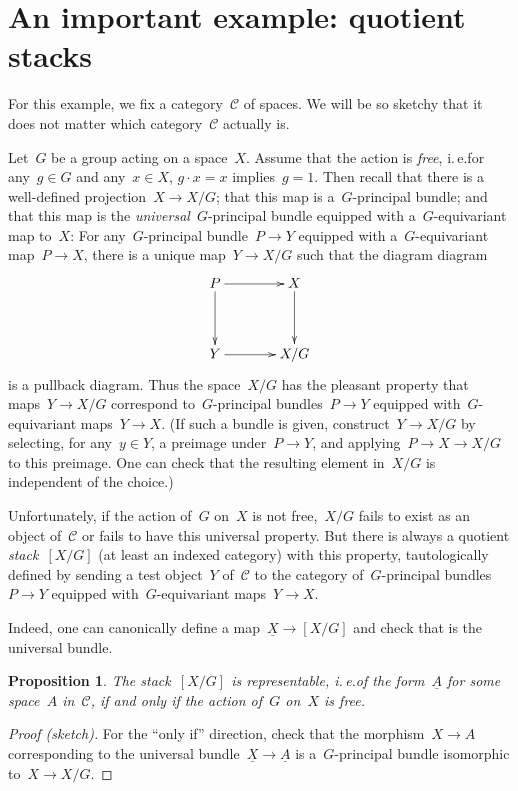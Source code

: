 \documentclass[a4paper,english,12pt]{scrartcl}
\theoremstyle{definition}
\theoremstyle{plain}
\newtheorem{prop}[defn]{Proposition}
\theoremstyle{remark}
\newcommand{\C}{\mathcal{C}}
\newcommand{\ul}[1]{\underline{#1}}
\begin{document}
\section{An important example: quotient stacks}

For this example, we fix a category~$\C$ of spaces. We will be so sketchy that
it does not matter which category~$\C$ actually is.

Let~$G$ be a group acting on a space~$X$. Assume that the action is
\emph{free}, i.\,e.\@ for any~$g \in G$ and any~$x \in X$, $g \cdot x = x$
implies~$g = 1$. Then recall that there is a well-defined projection~$X \to
X/G$; that this map is a~$G$-principal bundle; and that this map is the
\emph{universal}~$G$-principal bundle equipped with a~$G$-equivariant map
to~$X$: For any~$G$-principal bundle~$P \to Y$ equipped with a~$G$-equivariant
map~$P \to X$, there is a unique map~$Y \to X/G$ such that the diagram
diagram
\[ \xymatrixcolsep{3pc}\xymatrixrowsep{3pc}\xymatrix{
  P \ar[r] \ar[d] & X \ar[d] \\
  Y \ar[r] & X/G
} \]
is a pullback diagram. Thus the space~$X/G$ has the pleasant property that
maps~$Y \to X/G$ correspond to~$G$-principal bundles~$P \to Y$ equipped
with~$G$-equivariant maps~$Y \to X$. (If such a bundle is given, construct~$Y
\to X/G$ by selecting, for any~$y \in Y$, a preimage under~$P \to Y$, and
applying~$P \to X \to X/G$ to this preimage. One can check that the resulting
element in~$X/G$ is independent of the choice.)

Unfortunately, if the action of~$G$ on~$X$ is not free,~$X/G$ fails to exist as
an object of~$\C$ or fails to have this universal property. But there is always
a quotient \emph{stack}~$[X/G]$ (at least an indexed category) with this
property, tautologically defined by sending a test object~$Y$ of~$\C$ to the
category of~$G$-principal bundles~$P \to Y$ equipped with~$G$-equivariant
maps~$Y \to X$.

Indeed, one can canonically define a map~$\ul{X} \to [X/G]$ and check that
is the universal bundle.

\begin{prop}The stack~$[X/G]$ is representable, i.\,e.\@ of the form~$\ul{A}$
for some space~$A$ in~$\C$, if and only if the action of~$G$ on~$X$ is
free.\end{prop}
\begin{proof}[Proof (sketch)]
For the ``only if'' direction, check that the morphism~$X \to A$ corresponding
to the universal bundle~$\ul{X} \to \ul{A}$ is a~$G$-principal bundle
isomorphic to~$X \to X/G$.
\end{proof}
\end{document}
